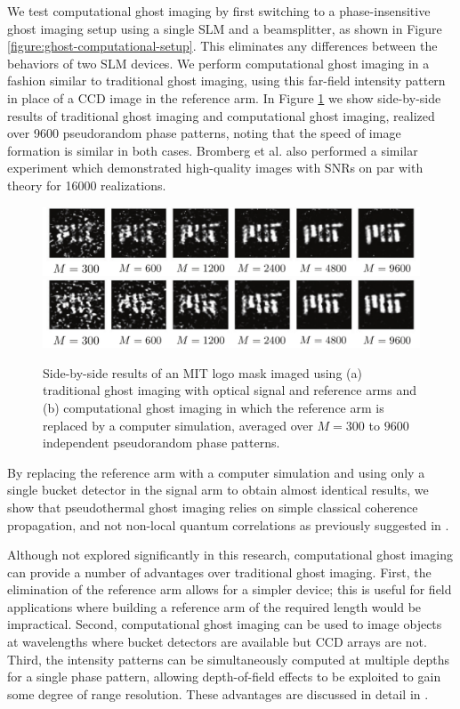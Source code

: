 We test computational ghost imaging by first switching to a phase-insensitive ghost imaging setup using a single SLM and a beamsplitter, as shown in Figure \ref{figure:ghost-computational-setup}. This eliminates any differences between the behaviors of two SLM devices. We perform computational ghost imaging in a fashion similar to traditional ghost imaging, using this far-field intensity pattern in place of a CCD image in the reference arm. In Figure \ref{figure:ghost-computational-result} we show side-by-side results of traditional ghost imaging and computational ghost imaging, realized over 9600 pseudorandom phase patterns, noting that the speed of image formation is similar in both cases. Bromberg et al. \cite{bromberg-ghost} also performed a similar experiment which demonstrated high-quality images with SNRs on par with theory for 16000 realizations.

\begin{figure}[t]
\begin{center}
\includegraphics[width=16cm]{figure-ghost-computational-result0.pdf}
\includegraphics[width=16cm]{figure-ghost-computational-result1.pdf}
\caption{Side-by-side results of an MIT logo mask imaged using (a) traditional ghost imaging with optical signal and reference arms and (b) computational ghost imaging in which the reference arm is replaced by a computer simulation, averaged over $M = 300$ to $9600$ independent pseudorandom phase patterns.}
\label{figure:ghost-computational-result}
\end{center}
\end{figure}

By replacing the reference arm with a computer simulation and using only a single bucket detector in the signal arm to obtain almost identical results, we show that pseudothermal ghost imaging relies on simple classical coherence propagation, and not non-local quantum correlations as previously suggested in \cite{TODO}.

Although not explored significantly in this research, computational ghost imaging can provide a number of advantages over traditional ghost imaging. First, the elimination of the reference arm allows for a simpler device; this is useful for field applications where building a reference arm of the required length would be impractical. Second, computational ghost imaging can be used to image objects at wavelengths where bucket detectors are available but CCD arrays are not. Third, the intensity patterns can be simultaneously computed at multiple depths for a single phase pattern, allowing depth-of-field effects to be exploited to gain some degree of range resolution. These advantages are discussed in detail in \cite{erkmen-from}.

